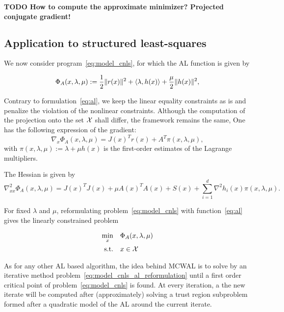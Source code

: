 \documentclass[10pt]{article}
\numberwithin{equation}{section}
\begin{document}
	 \textbf{TODO How to compute the approximate minimizer? Projected conjugate gradient!}
	 \subsection{Application to structured least-squares}
	 
	 We now consider program~\eqref{eq:model_cnls}, for which the AL function is given by
	 
	 \begin{equation}
	 	\label{eq:lsal}
	 	\Phi_A(x,\lambda,\mu) := \dfrac{1}{2}\|r(x)\|^2 + \left\langle {\lambda} , {h(x)} \right\rangle + \dfrac{\mu}{2} \|h(x)\|^2,
	 \end{equation}
	 
	 Contrary to formulation~\eqref{eq:al}, we keep the linear equality constraints as is and penalize the violation of the nonlinear constraints. Although the computation of the projection onto the set ${\mathcal{X}}$ shall differ, the framework remains the same, 
	 One has the following expression of the gradient: 
	 \begin{equation}
	 	\label{eq:al_grad}
	 	\nabla_x \Phi_A(x,\lambda,\mu) = J(x)^Tr(x) + A^T\pi(x,\lambda,\mu),
	 \end{equation}
	 with $\pi(x,\lambda,\mu):=\lambda + \mu h(x)$ is the first-order estimates of the Lagrange multipliers. 
	 
	 The Hessian is given by
	 \begin{equation}\label{eq:al_hessian}
	 	\nabla^2_{xx} \Phi_A(x,\lambda,\mu) = J(x)^TJ(x) + \mu A(x)^TA(x) +  S(x) + \sum_{i=1}^d \nabla^2 h_i(x) \pi(x,\lambda,\mu).
	 \end{equation}
	 
	 For fixed $\lambda$ and $\mu$, reformulating problem~\eqref{eq:model_cnls} with function~\eqref{eq:al} gives the linearly constrained problem
	 
	 \begin{equation}\label{eq:model_cnls_al_reformulation} 
	 	\begin{aligned}
	 		\min_{x} \quad& \Phi_A(x,\lambda,\mu)  \\
	 		\text{s.t.}  \quad & x \in {\mathcal{X}} 
	 	\end{aligned}	
	 \end{equation}
	 
	 As for any other AL based algorithm, the idea behind MCWAL is to solve by an iterative method problem~\eqref{eq:model_cnls_al_reformulation} until a first order critical point of problem~\eqref{eq:model_cnls} is found. At every iteration, a the new iterate will be computed after (approximately) solving a trust region subproblem formed after a quadratic model of the AL around the current iterate. 
	 
\end{document}
